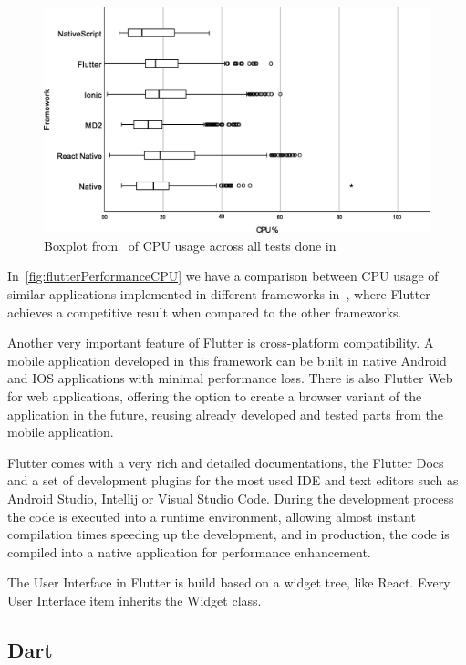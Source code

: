 \documentclass[a4paper,12pt]{report}
\begin{document}
\begin{figure}[H]
    \centering
    \includegraphics[scale=0.4]{images/flutterPerformance/cpu.png}
    \caption{Boxplot from~\cite{flutterPerformance} of CPU usage across all tests done in~\cite{flutterPerformance} }\label{fig:flutterPerformanceCPU}
\end{figure}

In~\autoref{fig:flutterPerformanceCPU} we have a comparison between CPU usage
of similar applications implemented in different frameworks
in~\cite{flutterPerformance}, where Flutter achieves a competitive result when
compared to the other frameworks.

Another very important feature of Flutter is cross-platform compatibility. A
mobile application developed in this framework can be built in native Android
and IOS applications with minimal performance loss. There is also Flutter Web
for web applications, offering the option to create a browser variant of the
application in the future, reusing already developed and tested parts from the
mobile application.

Flutter comes with a very rich and detailed documentations, the Flutter
Docs\cite{flutterDocs} and a set of development plugins for the most used IDE
and text editors such as Android Studio, Intellij or Visual Studio Code. During
the development process the code is executed into a runtime environment,
allowing almost instant compilation times speeding up the development, and in
production, the code is compiled into a native application for performance
enhancement.

The User Interface in Flutter is build based on a widget tree, like React.
Every User Interface item inherits the Widget class.

\subsection{Dart}\label{chapter:dart}
\end{document}
